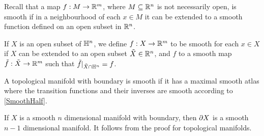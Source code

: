 \noindent Recall that a map $f:M\to\mathbb{R}^m$, where $M\subseteq \mathbb{R}^n$ is not necessarily open, is smooth if in a neighbourhood of each $x\in M$ it can be extended to a smooth function defined on an open subset in $\mathbb{R}^n$. 

\begin{defn}\label{SmoothHalf}
    If $X$ is an open subset of $\mathbb{H}^n$, we define $f:X\to\mathbb{R}^m$ to be smooth for each $x\in X$ if $X$ can be extended to an open subset $\tilde{X}\in\mathbb{R}^n$, and $f$ to a smooth map $\tilde{f}:\tilde{X}\to\mathbb{R}^m$ such that $\tilde{f}|_{\tilde{X}\cap\mathbb{H}^n}=f$. 
\end{defn}

\begin{defn}
    A topological manifold with boundary is smooth if it has a maximal smooth atlas where the transition functions and their inverses are smooth according to \ref{SmoothHalf}.
\end{defn}

\begin{cor}
    If $X$ is a smooth $n$ dimensional manifold with boundary, then $\partial X$ is a smooth $n-1$ dimensional manifold. It follows from the proof for topological manifolds.
\end{cor}
     

